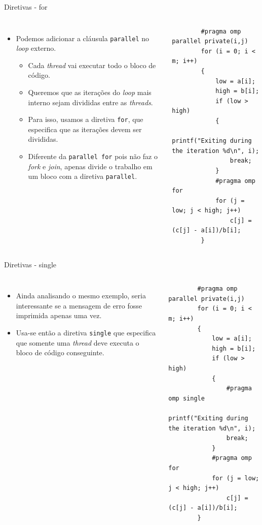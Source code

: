 \begin{frame}[fragile]{Diretivas - for}
	\begin{columns}
		\begin{itemize}
			\item Podemos adicionar a cláusula \texttt{parallel} no \textit{loop} externo.
			\smallskip
			\begin{itemize}
				\item Cada \textit{thread} vai executar todo o bloco de código.
				\smallskip
				\item Queremos que as iterações do \textit{loop} mais interno sejam divididas entre as \textit{threads}.
				\smallskip
				\item Para isso, usamos a diretiva \texttt{for}, que especifica que as iterações devem ser divididas.
				\smallskip
				\item Diferente da \texttt{parallel for} pois não faz o \textit{fork} e \textit{join}, apenas divide o trabalho em um bloco com a diretiva \texttt{parallel}.
			\end{itemize}
		\end{itemize}
		\begin{verbatim}
		#pragma omp parallel private(i,j)
		for (i = 0; i < m; i++)
		{
			low = a[i];
			high = b[i];
			if (low > high)
			{
				printf("Exiting during the iteration %d\n", i);
				break;
			}
			#pragma omp for
			for (j = low; j < high; j++)
				c[j] = (c[j] - a[i])/b[i];
		}
		\end{verbatim}
	\end{columns}
\end{frame}

\begin{frame}[fragile]{Diretivas - single}
	\begin{columns}
		\column{0.4\linewidth}
		\begin{itemize}
			\item Ainda analisando o mesmo exemplo, seria interessante se a mensagem de erro fosse imprimida apenas uma vez.
			\smallskip
			\item Usa-se então a diretiva \texttt{single} que especifica que somente uma \textit{thread} deve executa o bloco de código conseguinte.
		\end{itemize}
		\column{0.6\linewidth}
		\begin{verbatim}
		#pragma omp parallel private(i,j)
		for (i = 0; i < m; i++)
		{
			low = a[i];
			high = b[i];
			if (low > high)
			{
				#pragma omp single
				printf("Exiting during the iteration %d\n", i);
				break;
			}
			#pragma omp for
			for (j = low; j < high; j++)
				c[j] = (c[j] - a[i])/b[i];
		}
		\end{verbatim}
	\end{columns}
\end{frame}

